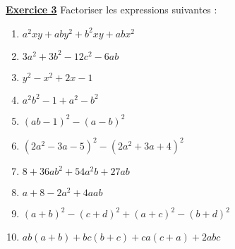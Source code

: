 \documentclass[12pt,a4paper]{article}
\newcommand{\exo}[1]{%
        \textbf{\underline{Exercice #1}}
}
\begin{document}
\exo{3} Factoriser les expressions suivantes :
\begin{enumerate}
    \item \( a^2xy + aby^2 + b^2xy + abx^2 \)
    \item \( 3a^2 + 3b^2 - 12c^2 - 6ab \)
    \item \( y^2 - x^2 + 2x - 1 \)
    \item \( a^2b^2 - 1 + a^2 - b^2 \)
    \item \( (ab - 1)^2 - (a - b)^2 \)
    \item \( (2a^2 - 3a - 5)^2 - (2a^2 + 3a + 4)^2  \)
    \item \( 8 + 36a b^2 + 54a^2b + 27ab \)
    \item \( a + 8 - 2a^2 + 4aab \)
    \item \( (a + b)^2 - (c + d)^2 + (a + c)^2 - (b + d)^2 \)
    \item \( ab(a + b) + bc(b + c) + ca(c + a) + 2abc \)
\end{enumerate}
\end{document}
